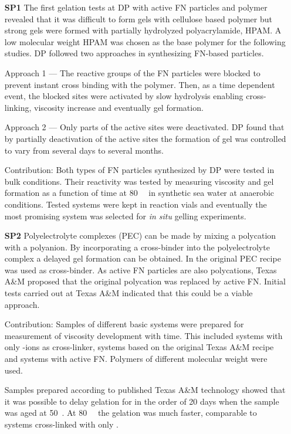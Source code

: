 \begin{itemize}
    \item [\textbf{SP1}] The first gelation tests at DP with active FN particles and polymer revealed that it was difficult to form gels with cellulose based polymer but strong gels were formed with partially hydrolyzed polyacrylamide,  HPAM. A low molecular weight HPAM was chosen as the base polymer for the following studies. DP followed two approaches in synthesizing FN-based particles. 
    
    Approach 1 --- The reactive groups of the FN particles were blocked to prevent instant cross binding with the polymer. Then, as a time dependent event, the blocked sites were activated by slow hydrolysis enabling cross-linking, viscosity increase and eventually gel formation.
    
    Approach 2 --- Only parts of the active sites were deactivated. DP found that by partially deactivation of the active sites the formation of gel was controlled to vary from several days to several months.
    
    {\color{blue} Contribution:} Both types of FN particles synthesized by DP were tested in bulk conditions. Their reactivity was tested by measuring viscosity and gel formation as a function of time at 80~\celsius~ in synthetic sea water at anaerobic conditions. Tested systems were kept in reaction vials and eventually the most promising system  was selected for \emph{in situ} gelling experiments.
    
    \item [\textbf{SP2}] Polyelectrolyte complexes  (PEC) can be made by mixing a polycation with a polyanion. By incorporating a cross-binder into the polyelectrolyte complex a delayed gel formation can be obtained. In the original PEC recipe  was used as cross-binder. As active FN particles are also polycations, Texas A\&M proposed that the original polycation was replaced by active FN. Initial tests carried out at Texas A\&M indicated that this could be a viable approach.
    
    {\color{blue} Contribution:} Samples of different basic systems were prepared for measurement of viscosity development with time. This included systems with only -ions as cross-linker, systems based on the original Texas A\&M recipe and systems with active FN. Polymers of different molecular weight were used.
    
    Samples prepared according to published Texas A\&M technology showed that it was possible to delay gelation for in the order of 20 days when the sample was aged at 50~\celsius. At 80~\celsius~ the gelation was much faster, comparable to systems cross-linked with only .
    

\end{itemize}
